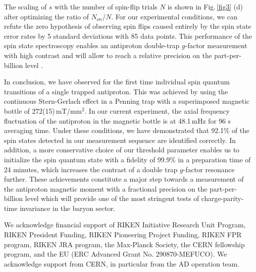 \documentclass[12pt,preprint%
]{elsarticle}
\begin{document}
The scaling of $s$ with the number of spin-flip trials $N$ is shown in Fig.$\,$\ref{fig3} (d) after optimizing the ratio of $N_{on}/N$. For our experimental conditions, we can refute the zero hypothesis of observing spin flips caused entirely by the spin state error rates by 5 standard deviations with 85 data points. This performance of the spin state spectroscopy enables an antiproton double-trap $g$-factor measurement with high contrast and will allow to reach a relative precision on the part-per-billion level \cite{MooserNature2014}.


In conclusion, we have observed for the first time individual spin quantum transitions of a single trapped antiproton. This was achieved by using the continuous Stern-Gerlach effect in a Penning trap with a superimposed magnetic bottle of 272(15)$\,$mT/mm$^2$. In our current experiment, the axial frequency fluctuation of the antiproton in the magnetic bottle is at 48.1$\,$mHz for 96 s averaging time. Under these conditions, we have demonstrated that 92.1$\%$ of the spin states detected in our measurement sequence are identified correctly. In addition, a more conservative choice of our threshold parameter enables us to initialize the spin quantum state with a fidelity of 99.9$\%$ in a preparation time of 24 minutes, which increases the contrast of a double trap $g$-factor resonance further. These achievements constitute a major step towards a measurement of the antiproton magnetic moment with a fractional precision on the part-per-billion level which will provide one of the most stringent tests of charge-parity-time invariance in the baryon sector. 

We acknowledge financial support of RIKEN Initiative Research Unit Program, RIKEN President Funding, RIKEN Pioneering Project Funding, RIKEN FPR program, RIKEN JRA program, the Max-Planck Society, the CERN fellowship program, and the EU (ERC Advanced Grant No. 290870-MEFUCO). We acknowledge support from CERN, in particular from the AD operation team.  
\end{document}
